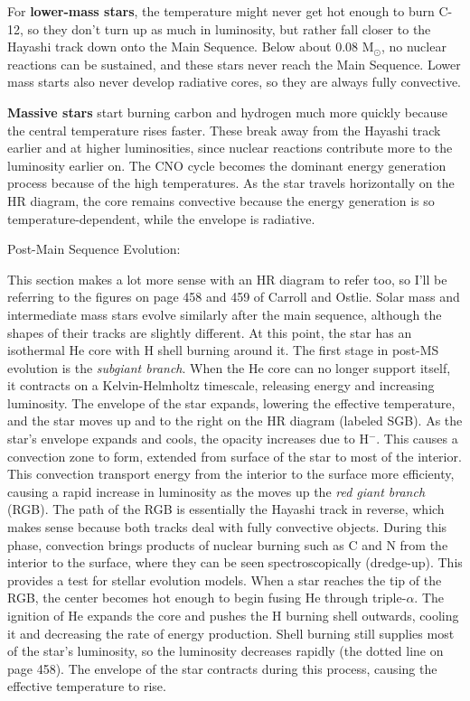 For \textbf{lower-mass stars}, the temperature might never get hot enough to burn C-12, so they don't turn up as much in luminosity, but rather fall closer to the Hayashi track down onto the Main Sequence. Below about 0.08 M$_\odot$, no nuclear reactions can be sustained, and these stars never reach the Main Sequence. Lower mass starts also never develop radiative cores, so they are always fully convective.

\textbf{Massive stars} start burning carbon and hydrogen much more quickly because the central temperature rises faster. These break away from the Hayashi track earlier and at higher luminosities, since nuclear reactions contribute more to the luminosity earlier on. The CNO cycle becomes the dominant energy generation process because of the high temperatures. As the star travels horizontally on the HR diagram, the core remains convective because the energy generation is so temperature-dependent, while the envelope is radiative.

Post-Main Sequence Evolution:

This section makes a lot more sense with an HR diagram to refer too, so I'll be referring to the 
figures on page 458 and 459 of Carroll and Ostlie.  Solar mass and intermediate mass stars 
evolve similarly after the main sequence, although the shapes of their tracks are slightly 
different.  At this point, the star has an isothermal He core with H shell burning around it.  
The first stage in post-MS evolution is the \emph{subgiant branch}.  When the He core 
can no longer support itself, it contracts on a Kelvin-Helmholtz timescale, releasing energy and 
increasing luminosity.  The envelope of the star expands, lowering the effective temperature, and 
the star moves up and to the right on the HR diagram (labeled SGB).  As the star's envelope 
expands and cools, the opacity increases due to H$^-$.  This causes a convection zone to form, 
extended from surface of the star to most of the interior.  This convection transport energy from 
the interior to the surface more efficienty, causing a rapid increase in luminosity as the moves 
up the \emph{red giant branch} (RGB).  The path of the RGB is essentially the Hayashi track in 
reverse, which makes sense because both tracks deal with fully convective objects.  During this 
phase, convection brings products of nuclear burning such as C and N from the interior to the 
surface, where they can be seen spectroscopically (dredge-up).  This provides a test for stellar 
evolution models.  When a star reaches the tip of the RGB, the center becomes hot enough to begin 
fusing He through triple-$\alpha$.  The ignition of He expands the core and pushes the H burning 
shell outwards, cooling it and decreasing the rate of energy production.  Shell burning still 
supplies most of the star's luminosity, so the luminosity decreases rapidly (the dotted line on 
page 458).  The envelope of the star contracts during this process, causing the effective 
temperature to rise.   

